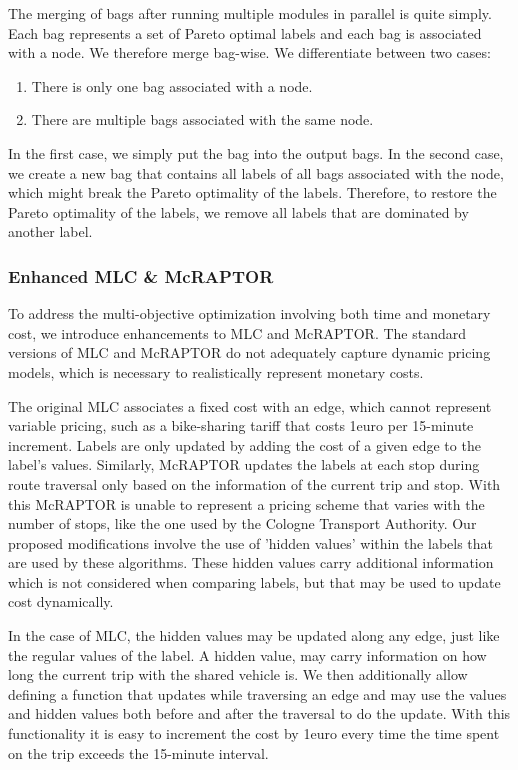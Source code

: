 The merging of bags after running multiple modules in parallel is quite simply.
Each bag represents a set of Pareto optimal labels and each bag is associated with a node.
We therefore merge bag-wise.
We differentiate between two cases:
\begin{enumerate}
    \item There is only one bag associated with a node.
    \item There are multiple bags associated with the same node.
\end{enumerate}
In the first case, we simply put the bag into the output bags.
In the second case, we create a new bag that contains all labels of all bags associated with the node, which might break the Pareto optimality of the labels.
Therefore, to restore the Pareto optimality of the labels, we remove all labels that are dominated by another label.

\subsubsection{Enhanced MLC \& McRAPTOR}
\label{subsubsec:enhanced_mlc_and_mcraptor}

To address the multi-objective optimization involving both time and monetary cost, we introduce enhancements to MLC and McRAPTOR. 
The standard versions of MLC and McRAPTOR do not adequately capture dynamic pricing models, which is necessary to realistically represent monetary costs.

The original MLC associates a fixed cost with an edge, which cannot represent variable pricing, such as a bike-sharing tariff that costs 1euro per 15-minute increment. 
Labels are only updated by adding the cost of a given edge to the label's values.
Similarly, McRAPTOR updates the labels at each stop during route traversal only based on the information of the current trip and stop. 
With this McRAPTOR is unable to represent a pricing scheme that varies with the number of stops, like the one used by the Cologne Transport Authority.
Our proposed modifications involve the use of 'hidden values' within the labels that are used by these algorithms. 
These hidden values carry additional information which is not considered when comparing labels, but that may be used to update cost dynamically.

In the case of MLC, the hidden values may be updated along any edge, just like the regular values of the label.
A hidden value, may carry information on how long the current trip with the shared vehicle is.
We then additionally allow defining a function that updates while traversing an edge and may use the values and hidden values both before and after the traversal to do the update.
With this functionality it is easy to increment the cost by 1euro every time the time spent on the trip exceeds the 15-minute interval.

